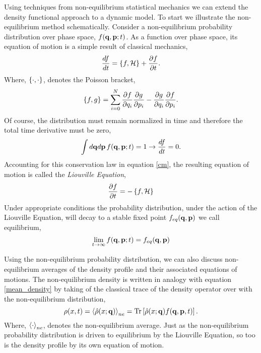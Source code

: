Using techniques from non-equilibrium statistical mechanics we can extend
the density functional approach to a dynamic model. To start we illustrate the 
non-equilibrium method schematically. Consider a non-equilibrium probability 
distribution over phase space, $f(\mathbf{q}, \mathbf{p}; t)$. As a function over phase space,
its equation of motion is a simple result of classical mechanics,
%
\begin{equation}
    \label{cm} 
    \frac{d f}{dt} = \left\lbrace f, \mathcal{H} \right\rbrace + \frac{\partial f}{\partial t}.
\end{equation}
%
Where, $\left\lbrace \cdot, \cdot \right\rbrace$, denotes the Poisson bracket,
%
\begin{equation}
    \left\lbrace f, g \right\rbrace = \sum_{i = 0}^N \frac{\partial f}{\partial q_i}
        \frac{\partial g}{\partial p_i} - \frac{\partial g}{\partial q_i}
        \frac{\partial f}{\partial p_i}.
\end{equation}
%
Of course, the distribution must remain normalized in time and therefore the 
total time derivative must be zero,
%
\begin{equation}
    \int d\mathbf{q} d\mathbf{p}\, f(\mathbf{q}, \mathbf{p}; t) = 1 \rightarrow \frac{d f}{dt} = 0.
\end{equation}
%
Accounting for this conservation law in equation \ref{cm}, the resulting
equation of motion is called the \textit{Liouville Equation},
%
\begin{equation}
    \label{liouville} 
    \frac{\partial f}{\partial t} = - \left\lbrace f , \mathcal{H} \right\rbrace
\end{equation}
%
Under appropriate conditions the probability distribution, under the action of
the Liouville Equation, will decay to a stable fixed point $f_{eq}(\mathbf{q}, \mathbf{p})$ we
call equilibrium,
%
\begin{equation}
    \lim_{t \rightarrow \infty} f(\mathbf{q}, \mathbf{p}; t) = f_{eq}(\mathbf{q}, \mathbf{p})
\end{equation}
%

Using the non-equilibrium probability distribution, we can also discuss
non-equilibrium averages of the density profile and their associated equations
of motions. The non-equilibrium density is written in analogy with equation
\ref{mean_density} by taking of the classical trace of the density operator
over with the non-equilibrium distribution,
%
\begin{equation}
    \rho(x, t) = \left\langle \hat{\rho}(x; \mathbf{q}) \right\rangle_{ne} =
        \mathrm{Tr}\left[ \hat{\rho}(x; \mathbf{q}) f(\mathbf{q}, \mathbf{p}, t) \right].
\end{equation}
%
Where, $\left\langle \cdot \right\rangle_{ne}$, denotes the non-equilibrium average. Just as the
non-equilibrium probability distribution is driven to equilibrium by the
Liouville Equation, so too is the density profile by its own equation of
motion.

